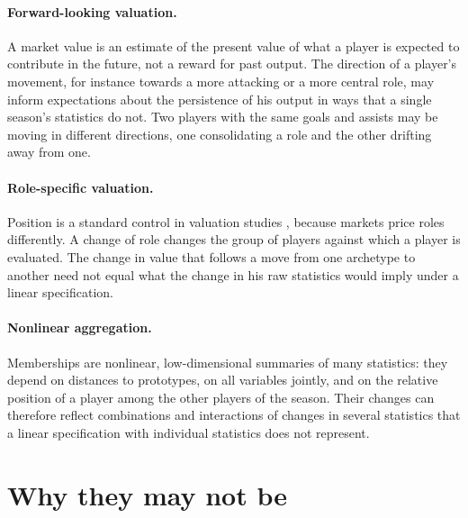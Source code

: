 \paragraph{Forward-looking valuation.} A market value is an estimate of the present value of what a player is expected to contribute in the future, not a reward for past output. The direction of a player's movement, for instance towards a more attacking or a more central role, may inform expectations about the persistence of his output in ways that a single season's statistics do not. Two players with the same goals and assists may be moving in different directions, one consolidating a role and the other drifting away from one.

\paragraph{Role-specific valuation.} Position is a standard control in valuation studies \cite{franceschi2024determinants,poli2024statistical}, because markets price roles differently. A change of role changes the group of players against which a player is evaluated. The change in value that follows a move from one archetype to another need not equal what the change in his raw statistics would imply under a linear specification.

\paragraph{Nonlinear aggregation.} Memberships are nonlinear, low-dimensional summaries of many statistics: they depend on distances to prototypes, on all variables jointly, and on the relative position of a player among the other players of the season. Their changes can therefore reflect combinations and interactions of changes in several statistics that a linear specification with individual statistics does not represent.

\section{Why they may not be}
\label{sec:theory-why-not}

